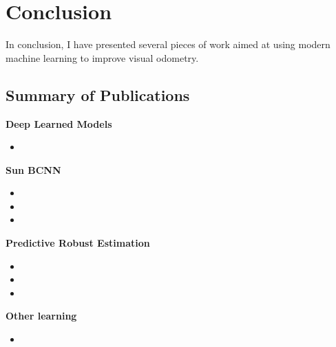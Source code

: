 \chapter{Conclusion}
In conclusion, I have presented several pieces of work aimed at using modern machine learning to improve visual odometry.

\section{Summary of Publications}
\textbf{Deep Learned Models}
\begin{itemize}
	\item {}
\end{itemize}

\noindent\textbf{Sun BCNN}

\begin{itemize}
	\item {}
	\item {}
	\item {}
\end{itemize}

\noindent\textbf{Predictive Robust Estimation}

\begin{itemize}
	\item {}
	\item {}
	\item {}
\end{itemize}

\noindent\textbf{Other learning}

\begin{itemize}
	\item {}
\end{itemize}
